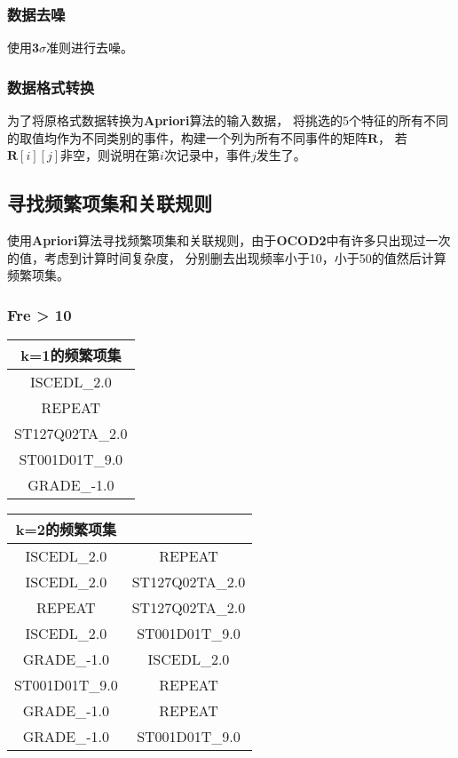 \documentclass[12pt, a4paper, oneside]{ctexart}
\begin{document}
\subsubsection{数据去噪}
使用\textbf{3$\sigma$}准则进行去噪。

\subsubsection{数据格式转换}
为了将原格式数据转换为\textbf{Apriori}算法的输入数据，
将挑选的5个特征的所有不同的取值均作为不同类别的事件，构建一个列为所有不同事件的矩阵$\mathbf{R}$，
若$\mathbf{R}[i][j]$非空，则说明在第$i$次记录中，事件$j$发生了。

\subsection{寻找频繁项集和关联规则}
使用\textbf{Apriori}算法寻找频繁项集和关联规则，由于\textbf{OCOD2}中有许多只出现过一次的值，考虑到计算时间复杂度，
分别删去出现频率小于10，小于50的值然后计算频繁项集。
\subsubsection{Fre > 10}
\begin{table}[h]
    \centering
    \begin{tabular}{c}
    \toprule
    k=1的频繁项集                                     \\
    \midrule
    ISCEDL\_2.0\\
    REPEAT\\
    ST127Q02TA\_2.0\\
    ST001D01T\_9.0\\
    GRADE\_-1.0\\
    \bottomrule
    \end{tabular}
\end{table}

\begin{table}[h]
    \centering
    \begin{tabular}{cc}
    \toprule
    k=2的频繁项集                                     \\
    \midrule
    ISCEDL\_2.0&REPEAT\\
    ISCEDL\_2.0&ST127Q02TA\_2.0\\
    REPEAT&ST127Q02TA\_2.0\\
    ISCEDL\_2.0&ST001D01T\_9.0\\
    GRADE\_-1.0&ISCEDL\_2.0\\
    ST001D01T\_9.0&REPEAT\\
    GRADE\_-1.0&REPEAT\\
    GRADE\_-1.0&ST001D01T\_9.0\\
    \bottomrule
    \end{tabular}
\end{table}
\end{document}
